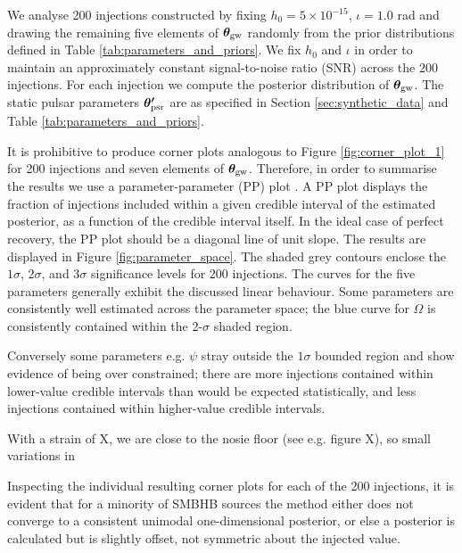 \documentclass[fleqn,usenatbib,useAMS]{mnras}
\begin{document}
We analyse 200 injections constructed by fixing $h_0 = 5 \times 10^{-15}$, $\iota =1.0$ rad and drawing the remaining five elements of $\boldsymbol{\theta}_{\rm gw}$ randomly from the prior distributions defined in Table \ref{tab:parameters_and_priors}. We fix $h_0$ and $\iota$ in order to maintain an approximately constant signal-to-noise ratio (SNR) across the 200 injections. For each injection we compute the posterior distribution of ${\boldsymbol{\theta}}_{\rm gw}$. The static pulsar parameters $\boldsymbol{\theta'}_{\rm psr}$ are as specified in Section \ref{sec:synthetic_data} and Table  \ref{tab:parameters_and_priors}. \newline 


It is prohibitive to produce corner plots analogous to Figure \ref{fig:corner_plot_1} for 200 injections and seven elements of $\boldsymbol{\theta}_{\rm gw}$. Therefore, in order to summarise the results we use a parameter-parameter (PP) plot \citep{doi:10.1198/106186006X136976}. A PP plot displays the fraction of injections included within a given credible interval of the estimated posterior, as a function of the credible interval itself. In the ideal case of perfect recovery, the PP plot should be a diagonal line of unit slope. The results are displayed in Figure \ref{fig:parameter_space}.  
The shaded grey contours enclose the $1\sigma$, $2\sigma$, and $3\sigma$ significance levels for 200 injections. The curves for the five parameters generally exhibit the discussed linear behaviour. Some parameters are consistently well estimated across the parameter space; the blue curve for $\Omega$ is consistently contained within the 2-$\sigma$ shaded region. 


Conversely some parameters e.g. $\psi$ stray outside the $1\sigma$ bounded region and show evidence of being over constrained; there are more injections contained within lower-value credible intervals than would be expected statistically, and less injections contained within higher-value credible intervals. 

With a strain of X, we are close to the nosie floor (see e.g. figure X), so small variations in 



Inspecting the individual resulting corner plots for each of the 200 injections, it is evident that for a minority of SMBHB sources the method either does not converge to a consistent unimodal one-dimensional posterior, or else a posterior is calculated but is slightly offset, not symmetric about the injected value. 
\end{document}
